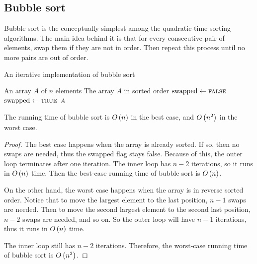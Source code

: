\subsection{Bubble sort}

Bubble sort is the conceptually simplest among the quadratic-time sorting algorithms. The main idea behind it is that for every consecutive pair of elements, swap them if they are not in order. Then repeat this process until no more pairs are out of order.

\begin{algorithm}[H]
    \caption{An iterative implementation of bubble sort}
    \begin{algorithmic}[1]
        \Require An array $A$ of $n$ elements
        \Ensure The array $A$ in sorted order
        \Repeat
            \State $\text{swapped} \gets \textsc{false}$
                    \State {}
                    \State $\text{swapped} \gets \textsc{true}$
                \EndIf
            \EndFor
        \Return $A$
        \EndFunction
    \end{algorithmic}
\end{algorithm}

\begin{claim}
    The running time of bubble sort is $O\left(n \right)$ in the best case, and $O\left(n^2 \right)$ in the worst case.
\end{claim}
\begin{proof}
    The best case happens when the array is already sorted. If so, then no swaps are needed, thus the swapped flag stays false. Because of this, the outer loop terminates after one iteration. The inner loop has $n-2$ iterations, so it runs in $O\left(n \right)$ time. Then the best-case running time of bubble sort is $O\left(n \right)$.

    On the other hand, the worst case happens when the array is in reverse sorted order. Notice that to move the largest element to the last position, $n-1$ swaps are needed. Then to move the second largest element to the second last position, $n-2$ swaps are needed, and so on. So the outer loop will have $n-1$ iterations, thus it runs in $O\left(n \right)$ time.

    The inner loop still has $n-2$ iterations. Therefore, the worst-case running time of bubble sort is $O\left(n^2 \right)$.
\end{proof}

